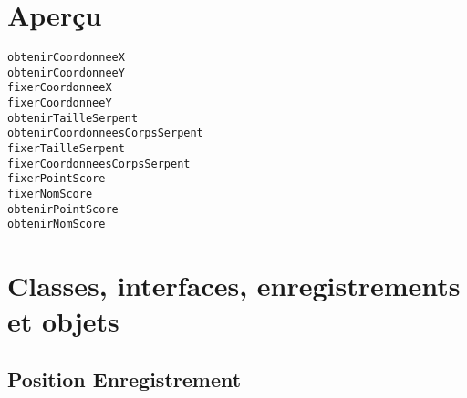 \documentclass{report}
\newif\ifpdf
\begin{document}
\section{Aperçu}
\begin{description}
\item[\texttt{\begin{ttfamily}Position\end{ttfamily} Enregistrement}]
\item[\texttt{\begin{ttfamily}Serpent\end{ttfamily} Enregistrement}]
\item[\texttt{\begin{ttfamily}Score\end{ttfamily} Enregistrement}]
\end{description}
\begin{description}
\item[\texttt{obtenirCoordonneeX}]
\item[\texttt{obtenirCoordonneeY}]
\item[\texttt{fixerCoordonneeX}]
\item[\texttt{fixerCoordonneeY}]
\item[\texttt{obtenirTailleSerpent}]
\item[\texttt{obtenirCoordonneesCorpsSerpent}]
\item[\texttt{fixerTailleSerpent}]
\item[\texttt{fixerCoordonneesCorpsSerpent}]
\item[\texttt{fixerPointScore}]
\item[\texttt{fixerNomScore}]
\item[\texttt{obtenirPointScore}]
\item[\texttt{obtenirNomScore}]
\end{description}
\section{Classes, interfaces, enregistrements et objets}
\ifpdf
\subsection*{\large{\textbf{Position Enregistrement}}\normalsize\hspace{1ex}\hrulefill}
\else
\subsection*{Position Enregistrement}
\fi
\label{Types.Position}
\end{document}
